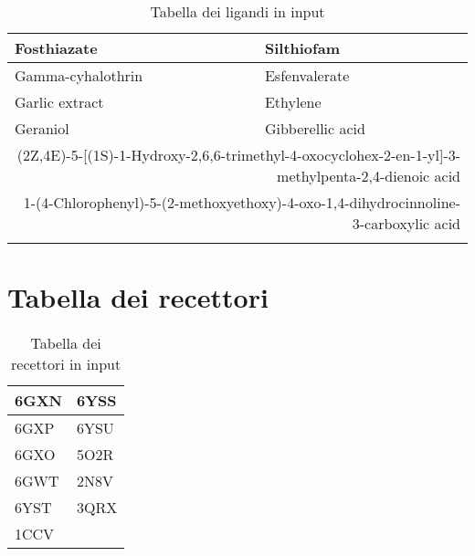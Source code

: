 \begin{small}
\begin{longtable}{|l|l|}
        Fosthiazate & Silthiofam \\ \hline
        Gamma-cyhalothrin & Esfenvalerate \\ \hline
        Garlic extract & Ethylene \\ \hline
        Geraniol & Gibberellic acid \\ \hline
        \multicolumn{2}{|r|}{{(2Z,4E)-5-[(1S)-1-Hydroxy-2,6,6-trimethyl-4-oxocyclohex-2-en-1-yl]-3-methylpenta-2,4-dienoic acid}}\\ \hline
        \multicolumn{2}{|r|}{{1-(4-Chlorophenyl)-5-(2-methoxyethoxy)-4-oxo-1,4-dihydrocinnoline-3-carboxylic acid}}\\ \hline
        \caption{Tabella dei ligandi in input} \label{tab:Tabella dei Ligandi}\\
    \end{longtable}
\end{small}

\chapter{Tabella dei recettori}
\begin{table}[!ht]
    \centering
    \begin{tabular}{|l|l|}
    \hline
        6GXN & 6YSS \\ \hline
        6GXP & 6YSU \\ \hline
        6GXO & 5O2R \\ \hline
        6GWT & 2N8V \\ \hline
        6YST & 3QRX \\ \hline
        1CCV & ~ \\ \hline
    \end{tabular}
    \caption{Tabella dei recettori in input} 
    \label{Tabella dei Recettori}
\end{table}